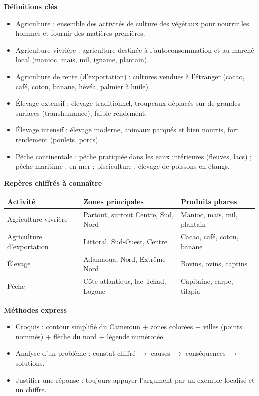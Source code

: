 \documentclass[11pt]{article}
\newcommand{\cle}[1]{{\popxbold\color{popdark}#1}}
\begin{document}
\begin{bilan}
\textbf{Définitions clés}
\begin{itemize}
\item \cle{Agriculture} : ensemble des activités de culture des végétaux pour nourrir les hommes et fournir des matières premières.
\item \cle{Agriculture vivrière} : agriculture destinée à l'autoconsommation et au marché local (manioc, maïs, mil, igname, plantain).
\item \cle{Agriculture de rente (d'exportation)} : cultures vendues à l'étranger (cacao, café, coton, banane, hévéa, palmier à huile).
\item \cle{Élevage extensif} : élevage traditionnel, troupeaux déplacés sur de grandes surfaces (transhumance), faible rendement.
\item \cle{Élevage intensif} : élevage moderne, animaux parqués et bien nourris, fort rendement (poulets, porcs).
\item \cle{Pêche continentale} : pêche pratiquée dans les eaux intérieures (fleuves, lacs) ; \cle{pêche maritime} : en mer ; \cle{pisciculture} : élevage de poissons en étangs.
\end{itemize}

\textbf{Repères chiffrés à connaître}
\begin{center}
\begin{tabularx}{\linewidth}{|l|X|X|}\hline
\rowcolor{popblueL} \textbf{Activité} & \textbf{Zones principales} & \textbf{Produits phares} \\ \hline
Agriculture vivrière & Partout, surtout Centre, Sud, Nord & Manioc, maïs, mil, plantain \\ \hline
Agriculture d'exportation & Littoral, Sud-Ouest, Centre & Cacao, café, coton, banane \\ \hline
Élevage & Adamaoua, Nord, Extrême-Nord & Bovins, ovins, caprins \\ \hline
Pêche & Côte atlantique, lac Tchad, Logone & Capitaine, carpe, tilapia \\ \hline
\end{tabularx}
\end{center}

\textbf{Méthodes express}
\begin{itemize}
\item Croquis : contour simplifié du Cameroun + zones colorées + villes (points nommés) + flèche du nord + légende numérotée.
\item Analyse d'un problème : constat chiffré $\rightarrow$ causes $\rightarrow$ conséquences $\rightarrow$ solutions.
\item Justifier une réponse : toujours appuyer l'argument par un exemple localisé et un chiffre.
\end{itemize}
\end{bilan}
\end{document}
